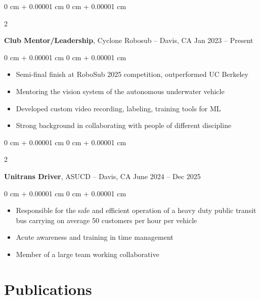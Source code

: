 \documentclass[10pt, letterpaper]{article}
\newenvironment{highlights}{
    \begin{itemize}[
        topsep=0.10 cm,
        parsep=0.10 cm,
        partopsep=0pt,
        itemsep=0pt,
        leftmargin=0 cm + 10pt
    ]
}{
    \end{itemize}
} %
\newenvironment{onecolentry}{
    \begin{adjustwidth}{
        0 cm + 0.00001 cm
    }{
        0 cm + 0.00001 cm
    }
}{
    \end{adjustwidth}
} %
\newenvironment{twocolentry}[2][]{
    \onecolentry
    \def\secondColumn{#2}
    \setcolumnwidth{\fill, 6 cm}
    \begin{paracol}{2}
}{
    \switchcolumn \raggedleft \secondColumn
    \end{paracol}
    \endonecolentry
} %
\begin{document}
        \vspace{0.2 cm}

        \begin{twocolentry}{
            Jan 2023 – Present
        }
            \textbf{Club Mentor/Leadership}, Cyclone Robosub -- Davis, CA\end{twocolentry}

        \vspace{0.10 cm}
        \begin{onecolentry}
            \begin{highlights}
                \item Semi-final finish at RoboSub 2025 competition, outperformed UC Berkeley
                \item Mentoring the vision system of the autonomous underwater vehicle
                \item Developed custom video recording, labeling, training tools for ML 
                \item Strong background in collaborating with people of different discipline

            \end{highlights}
        \end{onecolentry}


        \vspace{0.2 cm}

        \begin{twocolentry}{
            June 2024 – Dec 2025
        }
            \textbf{Unitrans Driver}, ASUCD -- Davis, CA\end{twocolentry}

        \vspace{0.10 cm}
        \begin{onecolentry}
            \begin{highlights}
                \item Responsible for the safe and efficient operation of a heavy duty public transit bus carrying on average 50 customers per hour per vehicle
                \item Acute awareness and training in time management
                \item Member of a large team working collaborative

            \end{highlights}
        \end{onecolentry}



    
    \section{Publications}
\end{document}
